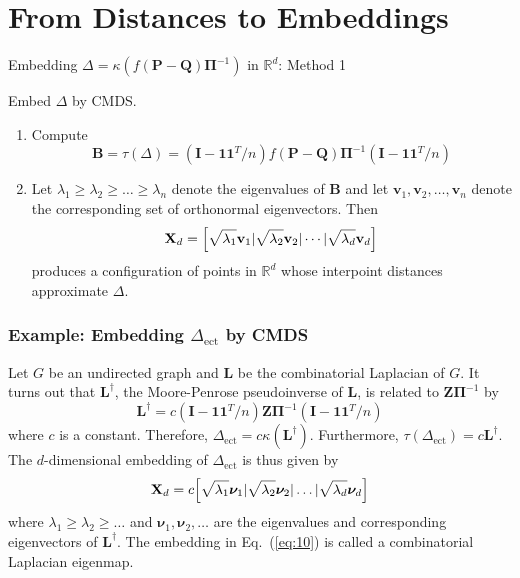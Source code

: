 \documentclass[professionalfonts, hyperref={pdfpagelabels=false,
  colorlinks=true, linkcolor=purple}]{beamer}
\begin{document}
\section{From Distances to Embeddings}

\begin{frame}{Embedding $\Delta = \kappa(f(\mathbf{P} -
    \mathbf{Q})\bm{\Pi}^{-1})$ in $\mathbb{R}^{d}$: Method 1}
  
  Embed $\Delta$ by CMDS.  
  \vskip 10pt
  \begin{enumerate}
  \item Compute 
    \begin{equation*}
      \mathbf{B} = \tau(\Delta) = (\mathbf{I} -
      \mathbf{1}\mathbf{1}^{T}/n) f(\mathbf{P} - \mathbf{Q})\bm{\Pi}^{-1} (\mathbf{I} -
      \mathbf{1}\mathbf{1}^{T}/n)
    \end{equation*}
  \item Let $\lambda_1 \geq \lambda_2 \geq \dots \geq \lambda_n$
    denote the eigenvalues of $\mathbf{B}$ and let $\bm{v}_1,
    \bm{v}_2, \dots, \bm{v}_n$ denote the corresponding set of
    orthonormal eigenvectors. Then
    \begin{equation*}
      \mathbf{X}_d = \Bigl[ \sqrt{\lambda_1} \mathbf{v}_1 |
      \sqrt{\lambda_2} \mathbf{v}_{2} | \cdots |
      \sqrt{\lambda_d} \mathbf{v}_d \Bigr]
    \end{equation*}
    produces a configuration of points in $\mathbb{R}^{d}$ whose
    interpoint distances approximate $\Delta$.
  \end{enumerate}
\end{frame}

\begin{frame}
  \frametitle{Example: Embedding $\Delta_{\mathrm{ect}}$ by CMDS}
  Let $G$ be an undirected graph and $\mathbf{L}$ be the combinatorial
  Laplacian of $G$. It turns out that $\mathbf{L}^{\dagger}$, the
  Moore-Penrose pseudoinverse of $\mathbf{L}$, is related to
  $\mathbf{Z}\bm{\Pi}^{-1}$ by
  \begin{equation}
    \label{eq:9}
    \mathbf{L}^{\dagger} = c(\mathbf{I} -
    \mathbf{1}\mathbf{1}^{T}/n)\mathbf{Z}\bm{\Pi}^{-1} (\mathbf{I} -
    \mathbf{1}\mathbf{1}^{T}/n)
 \end{equation}
  where $c$ is a constant. Therefore, $\Delta_{\mathrm{ect}} = c
  \kappa(\mathbf{L}^{\dagger})$. Furthermore,
  $\tau(\Delta_{\mathrm{ect}}) = c\mathbf{L}^{\dagger}$. The
  $d$-dimensional embedding of $\Delta_{\mathrm{ect}}$ is thus given
  by
  \begin{equation}
    \label{eq:10}
    \mathbf{X}_d = c\Bigl[\sqrt{\lambda_1} \bm{\nu}_1 |
    \sqrt{\lambda_2} \bm{\nu}_2 | \dots |  
  \sqrt{\lambda_d} \bm{\nu}_d \Bigr]
  \end{equation}
  where $\lambda_1 \geq \lambda_2 \geq \dots$ and $\bm{\nu}_1,
  \bm{\nu}_2, \dots$ are the eigenvalues and corresponding
  eigenvectors of $\mathbf{L}^{\dagger}$. 
  \vskip10pt The embedding in Eq.~(\ref{eq:10}) is called a
  \alert{combinatorial} Laplacian eigenmap.
\end{frame}
\end{document}
